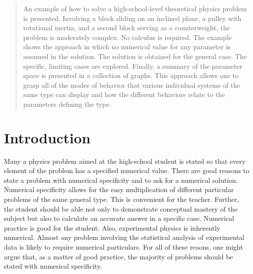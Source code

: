 \documentclass[twocolumn]{article}
\begin{document}
\thispagestyle{fancy}

\begin{abstract}

   An example of how to solve a high-school-level theoretical physics problem
   is presented.  Involving a block sliding on an inclined plane, a pulley with
   rotational inertia, and a second block serving as a counterweight, the
   problem is moderately complex.  No calculus is required.  The example shows
   the approach in which no numerical value for any parameter is assumed in the
   solution.  The solution is obtained for the general case.  The specific,
   limiting cases are explored.  Finally, a summary of the parameter space is
   presented in a collection of graphs.  This approach allows one to grasp all
   of the modes of behavior that various individual systems of the same type
   can display and how the different behaviors relate to the parameters
   defining the type.

\end{abstract}

\section{Introduction}

Many a physics problem aimed at the high-school student is stated so that every
element of the problem has a specified numerical value.  There are good reasons
to state a problem with numerical specificity and to ask for a numerical
solution.  Numerical specificity allows for the easy multiplication of
different particular problems of the same general type.  This is convenient for
the teacher.  Further, the student should be able not only to demonstrate
conceptual mastery of the subject but also to calculate an accurate answer in a
specific case.  Numerical practice is good for the student.  Also, experimental
physics is inherently numerical. Almost any problem involving the statistical
analysis of experimental data is likely to require numerical particulars. For
all of these reaons, one might argue that, as a matter of good practice, the
majority of problems should be stated with numerical specificity.
\end{document}
